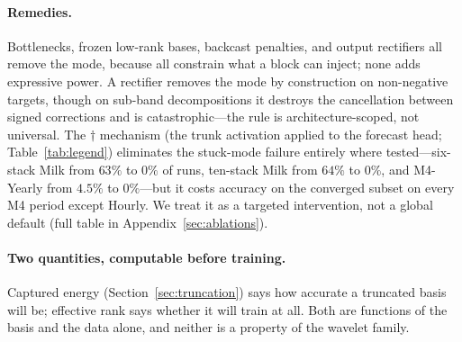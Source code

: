 \paragraph{Remedies.}
Bottlenecks, frozen low-rank bases, backcast penalties, and output rectifiers all remove the
mode, because all constrain what a block can inject; none adds expressive power. A rectifier
removes the mode by construction on non-negative targets, though on sub-band decompositions it
destroys the cancellation between signed corrections and is catastrophic---the rule is
architecture-scoped, not universal. The $\dagger$ mechanism (the trunk activation applied to the
forecast head; Table~\ref{tab:legend}) eliminates the stuck-mode failure entirely where
tested---six-stack Milk from $63\%$ to $0\%$ of runs, ten-stack Milk from $64\%$ to $0\%$, and
M4-Yearly from $4.5\%$ to $0\%$---but it costs accuracy on the converged subset on every M4
period except Hourly. We treat it as a targeted intervention, not a global default (full table
in Appendix~\ref{sec:ablations}).

\paragraph{Two quantities, computable before training.}
Captured energy (Section~\ref{sec:truncation}) says how accurate a truncated basis will be;
effective rank says whether it will train at all. Both are functions of the basis and the data
alone, and neither is a property of the wavelet family.
